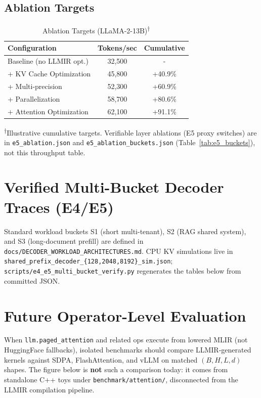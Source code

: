 \documentclass[conference]{IEEEtran}
\begin{document}
\subsection{Ablation Targets}

\begin{table}[htbp]
\caption{Ablation Targets (LLaMA-2-13B)\textsuperscript{$\dagger$}}
\begin{center}
\small
\begin{tabular}{|l|c|c|}
\hline
\textbf{Configuration} & \textbf{Tokens/sec} & \textbf{Cumulative} \\
\hline
Baseline (no LLMIR opt.) & 32,500 & - \\
\hline
+ KV Cache Optimization & 45,800 & +40.9\% \\
\hline
+ Multi-precision & 52,300 & +60.9\% \\
\hline
+ Parallelization & 58,700 & +80.6\% \\
\hline
+ Attention Optimization & 62,100 & +91.1\% \\
\hline
\end{tabular}
\label{tab:ablation}
\end{center}
\textsuperscript{$\dagger$}\footnotesize Illustrative cumulative targets. Verifiable layer ablations (E5 proxy switches) are in \texttt{e5\_ablation.json} and \texttt{e5\_ablation\_buckets.json} (Table~\ref{tab:e5_buckets}), not this throughput table.
\end{table}

\section{Verified Multi-Bucket Decoder Traces (E4/E5)}
\label{app:verified_buckets}

Standard workload buckets S1 (short multi-tenant), S2 (RAG shared system), and S3 (long-document prefill) are defined in \texttt{docs/DECODER\_WORKLOAD\_ARCHITECTURES.md}. CPU KV simulations live in \texttt{shared\_prefix\_decoder\_\{128,2048,8192\}\_sim.json}; \texttt{scripts/e4\_e5\_multi\_bucket\_verify.py} regenerates the tables below from committed JSON.



\section{Future Operator-Level Evaluation}
\label{app:future_ops}

When \texttt{llm.paged\_attention} and related ops execute from lowered MLIR (not HuggingFace fallbacks), isolated benchmarks should compare LLMIR-generated kernels against SDPA, FlashAttention, and vLLM on matched $(B, H, L, d)$ shapes. The figure below is \textbf{not} such a comparison today: it comes from standalone C++ toys under \texttt{benchmark/attention/}, disconnected from the LLMIR compilation pipeline.
\end{document}
